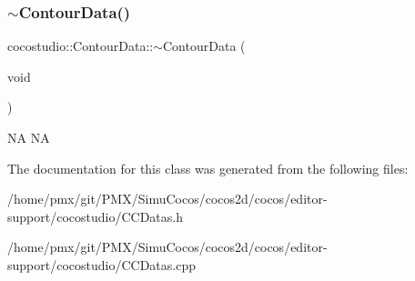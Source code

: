 \subsubsection{\texorpdfstring{$\sim$\+Contour\+Data()}{~ContourData()}\hspace{0.1cm}{\footnotesize\ttfamily [2/2]}}
{\footnotesize\ttfamily cocostudio\+::\+Contour\+Data\+::$\sim$\+Contour\+Data (\begin{DoxyParamCaption}\item[{void}]{ }\end{DoxyParamCaption})}

NA  NA 

The documentation for this class was generated from the following files\+:\begin{DoxyCompactItemize}
\item 
/home/pmx/git/\+P\+M\+X/\+Simu\+Cocos/cocos2d/cocos/editor-\/support/cocostudio/C\+C\+Datas.\+h\item 
/home/pmx/git/\+P\+M\+X/\+Simu\+Cocos/cocos2d/cocos/editor-\/support/cocostudio/C\+C\+Datas.\+cpp\end{DoxyCompactItemize}
